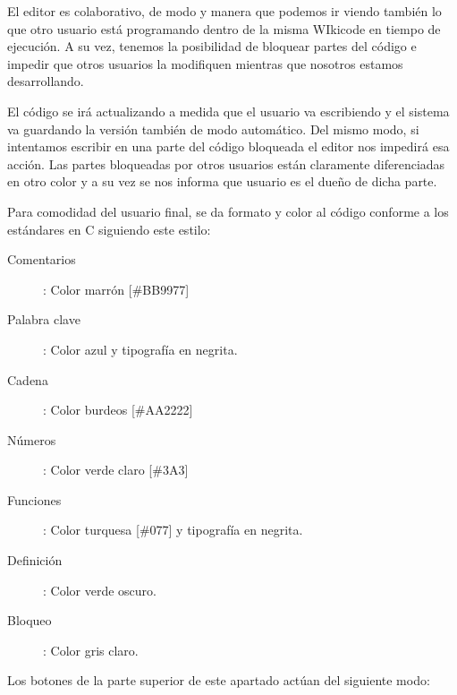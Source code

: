 El editor es colaborativo, de modo y manera que podemos ir viendo también lo que otro usuario está programando dentro de la misma WIkicode en tiempo de ejecución. A su vez, tenemos la posibilidad de bloquear partes del código e impedir que otros usuarios la modifiquen mientras que nosotros estamos desarrollando.

El código se irá actualizando a medida que el usuario va escribiendo y el sistema va guardando la versión también de modo automático. Del mismo modo, si intentamos escribir en una parte del código bloqueada el editor nos impedirá esa acción. Las partes bloqueadas por otros usuarios están claramente diferenciadas en otro color y a su vez se nos informa que usuario es el dueño de dicha parte.

\newpage

Para comodidad del usuario final, se da formato y color al código conforme a los estándares en C siguiendo este estilo:

\begin{description}
	\item[Comentarios]: Color marrón [\#BB9977]
	\item[Palabra clave]: Color azul y tipografía en negrita.
	\item[Cadena]: Color burdeos [\#AA2222]
	\item[Números]: Color verde claro [\#3A3]
	\item[Funciones]: Color turquesa [\#077] y tipografía en negrita.
	\item[Definición]: Color verde oscuro.
	\item[Bloqueo]: Color gris claro.
\end{description}

Los botones de la parte superior de este apartado actúan del siguiente modo:

